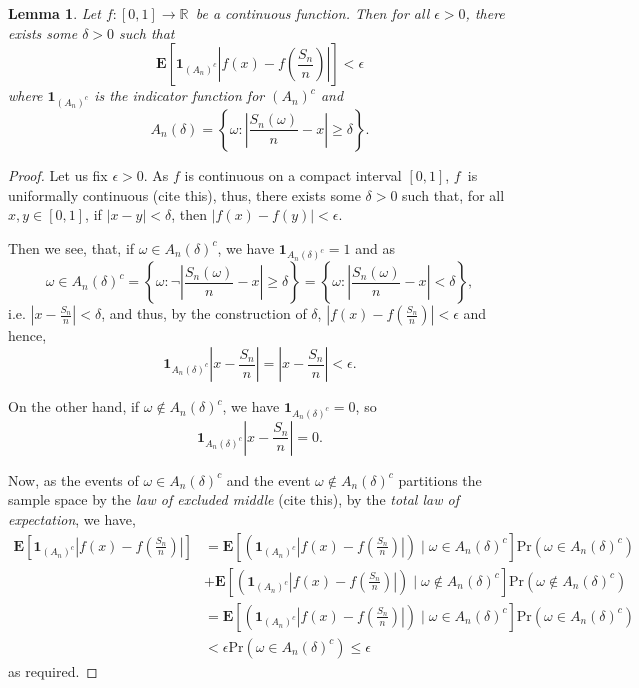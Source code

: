 \documentclass[
]{article}
\newtheorem{lemma}{Lemma}[theorem]
\begin{document}
\begin{lemma}\label{a}
Let $f : [0, 1] \to \mathbb{R}$ be a continuous function. Then for all $\epsilon > 0$, there exists some $\delta >0$ 
such that 
$$\mathbf{E}\left[ \mathbf{1}_{(A_n)^c} \left| f(x) - f \left(\frac{S_n}{n}\right) \right| \right] < \epsilon$$
where $\mathbf{1}_{(A_n)^c}$ is the indicator function for $(A_n)^c$ and 
$$ A_n(\delta) = \left\{\omega : \left| \frac{S_n(\omega)}{n} - x \right| \ge \delta \right\}.$$

\end{lemma}
\begin{proof}
Let us fix $\epsilon > 0$. As $f$ is continuous on a compact interval $[0, 1]$, $f$ is uniformally continuous 
(cite this), thus, there exists some $\delta > 0$ such that, for all $x, y \in [0, 1]$, if 
$\left| x - y \right| < \delta$, then $\left| f(x) - f(y) \right| < \epsilon$.

Then we see, that, if $\omega \in A_n(\delta)^c$, we have $\mathbf{1}_{A_n(\delta)^c} = 1$ and as 
$$\omega \in A_n(\delta)^c = \left\{\omega : \neg \left| \frac{S_n(\omega)}{n} - x \right| \ge \delta \right\} = 
\left\{\omega : \left| \frac{S_n(\omega)}{n} - x \right| < \delta \right\},$$ 
i.e. $\left| x - \frac{S_n}{n} \right| < \delta$, 
and thus, by the construction of $\delta$, $\left| f(x) - f\left(\frac{S_n}{n}\right) \right| < \epsilon$ and hence,
$$\mathbf{1}_{A_n(\delta)^c}\left| x - \frac{S_n}{n} \right| = \left| x - \frac{S_n}{n} \right| < \epsilon.$$

On the other hand, if $\omega \not\in A_n(\delta)^c$, we have $\mathbf{1}_{A_n(\delta)^c} = 0$, so
$$\mathbf{1}_{A_n(\delta)^c}\left| x - \frac{S_n}{n} \right| = 0.$$

\newpage
Now, as the events of $\omega \in A_n(\delta)^c$ and the event $\omega \not\in A_n(\delta)^c$ 
partitions the sample space by the \textit{law of excluded middle} (cite this), by the \textit{total 
law of expectation}, we have,
\begin{align*}
\mathbf{E}\left[ \mathbf{1}_{(A_n)^c} \left| f(x) - f \left(\frac{S_n}{n}\right) \right| \right] & = \mathbf{E}\left[ \left(\mathbf{1}_{(A_n)^c} \left| f(x) - f \left(\frac{S_n}{n}\right) \right| \right) \mid \omega \in A_n(\delta)^c \right] \text{Pr}(\omega \in A_n(\delta)^c) \\
& + \mathbf{E}\left[ \left( \mathbf{1}_{(A_n)^c} \left| f(x) - f \left(\frac{S_n}{n} \right) \right| \right) \mid \omega \not\in A_n(\delta)^c \right] \text{Pr}(\omega \not\in A_n(\delta)^c) \\
& = \mathbf{E}\left[ \left(\mathbf{1}_{(A_n)^c} \left| f(x) - f \left(\frac{S_n}{n}\right) \right| \right) \mid \omega \in A_n(\delta)^c \right] \text{Pr}(\omega \in A_n(\delta)^c)\\
& < \epsilon \text{Pr}(\omega \in A_n(\delta)^c) \le \epsilon
\end{align*}
as required.
\end{proof}
\end{document}
